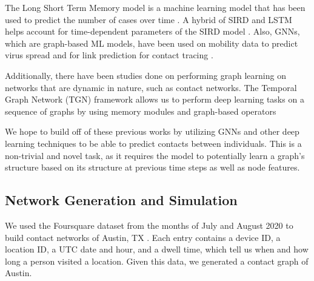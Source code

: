 \documentclass[times, 10pt,twocolumn]{article}
\begin{document}
The Long Short Term Memory model is a machine learning model that has been used to predict the number of cases over time \cite{SEIRD-LSTM}. A hybrid of SIRD and LSTM helps account for time-dependent parameters of the SIRD model \cite{SIRD-LSTM-hybrid}. Also, GNNs, which are graph-based ML models, have been used on mobility data to predict virus spread and for link prediction for contact tracing \cite{positivity-hospitalization-GNN}\cite{contact-tracing-GNN}.

Additionally, there have been studies done on performing graph learning on networks that are dynamic in nature, such as contact networks. The Temporal Graph Network (TGN) framework allows us to perform deep learning tasks on a sequence of graphs by using memory modules and graph-based operators \cite{rossi2020temporal}

We hope to build off of these previous works by utilizing GNNs and other deep learning techniques to be able to predict contacts between individuals. This is a non-trivial and novel task, as it requires the model to potentially learn a graph's structure based on its structure at previous time steps as well as node features.


\subsection{Network Generation and Simulation}

We used the Foursquare dataset from the months of July and August 2020 to build contact networks of Austin, TX \cite{DVN/PFLAH4_2020}. Each entry contains a device ID, a location ID, a UTC date and hour, and a dwell time, which tell us when and how long a person visited a location. Given this data, we generated a contact graph of Austin.

\end{document}
